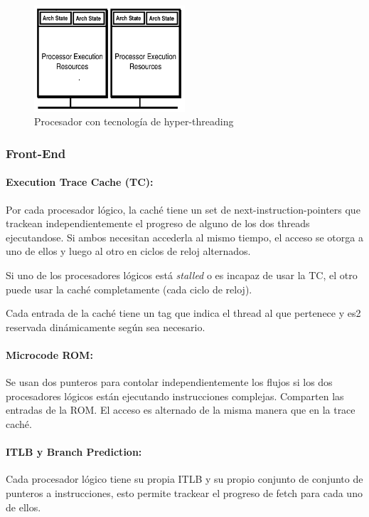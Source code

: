 \begin{figure}[ht]
	\centering
	\includegraphics[width=0.5\textwidth]{imagenes/multithreading-procesor}
	\caption{Procesador con tecnología de hyper-threading}
	\label{fig:xenonHyperThreadingTechnology}
\end{figure}

\subsubsection{Front-End}
\paragraph{Execution Trace Cache (TC):}
Por cada procesador lógico, la caché tiene un set de next-instruction-pointers que trackean independientemente el progreso de alguno de los dos threads ejecutandose. Si ambos necesitan accederla al mismo tiempo, el acceso se otorga a uno de ellos y luego al otro en ciclos de reloj alternados.
	
Si uno de los procesadores lógicos está \textit{stalled} o es incapaz de usar la TC, el otro puede usar la caché completamente (cada ciclo de reloj).

Cada entrada de la caché tiene un tag que indica el thread al que pertenece y es2 reservada dinámicamente según sea necesario.

\paragraph{Microcode ROM:} Se usan dos punteros para contolar independientemente los flujos si los dos procesadores lógicos están ejecutando instrucciones complejas. Comparten las entradas de la ROM. El acceso es alternado de la misma manera que en la trace caché.

\paragraph{ITLB y Branch Prediction:} Cada procesador lógico tiene su propia ITLB y su propio conjunto de conjunto de punteros a instrucciones, esto permite trackear el progreso de fetch para cada uno de ellos.

